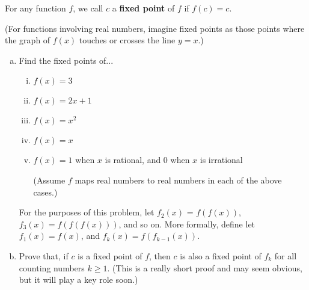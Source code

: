 \begin{problem}
\label{pr:fp-intro}
For any function $f$, we call $c$ a \textbf{fixed point} of $f$ if $f(c) = c$. 

(For functions involving real numbers, imagine fixed points as those points where the graph of $f(x)$ touches or crosses the line $y = x$.)


\begin{enumerate}[(a)]
\item Find the fixed points of... 
\begin{enumerate}[i.]
\item $f(x) = 3$
\item $f(x) = 2x + 1$
\item $f(x) = x^2$
\item $f(x) = x$
\item $f(x) = 1$ when $x$ is rational, and 0 when $x$ is irrational

(Assume $f$ maps real numbers to real numbers in each of the above cases.)
\end{enumerate}

For the purposes of this problem, let $f_2(x)$ = $f(f(x))$, $f_3(x) = f(f(f(x)))$, and so on. More formally, define let $f_1(x) = f(x)$, and $f_k(x) = f(f_{k-1}(x))$.

\item Prove that, if $c$ is a fixed point of $f$, then $c$ is also a fixed point of $f_k$ for all counting numbers $k \geq 1$. (This is a really short proof and may seem obvious, but it will play a key role soon.)
\end{enumerate}
\end{problem}


